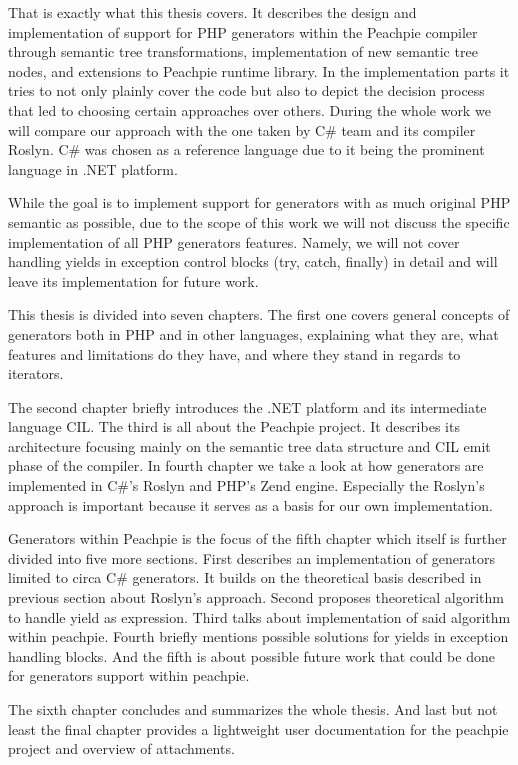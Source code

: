 That is exactly what this thesis covers. It describes the design and implementation of support for PHP generators within the Peachpie compiler through semantic tree transformations, implementation of new semantic tree nodes, and extensions to Peachpie runtime library. In the implementation parts it tries to not only plainly cover the code but also to depict the decision process that led to choosing certain approaches over others. During the whole work we will compare our approach with the one taken by C\# team and its compiler Roslyn. C\# was chosen as a reference language due to it being the prominent language in .NET platform.

While the goal is to implement support for generators with as much original PHP semantic as possible, due to the scope of this work we will not discuss the specific implementation of all PHP generators features. Namely, we will not cover handling yields in exception control blocks (try, catch, finally) in detail and will leave its implementation for future work.

This thesis is divided into seven chapters. The first one covers general concepts of generators both in PHP and in other languages, explaining what they are, what features and limitations do they have, and where they stand in regards to iterators. 

The second chapter briefly introduces the .NET platform and its intermediate language CIL. The third is all about the Peachpie project. It describes its architecture focusing mainly on the semantic tree data structure and CIL emit phase of the compiler. In fourth chapter we take a look at how generators are implemented in C\#’s Roslyn and PHP’s Zend engine. Especially the Roslyn’s approach is important because it serves as a basis for our own implementation.
 
Generators within Peachpie is the focus of the fifth chapter which itself is further divided into five more sections. First describes an implementation of generators limited to circa C\# generators. It builds on the theoretical basis described in previous section about Roslyn’s approach. Second proposes theoretical algorithm to handle yield as expression. Third talks about implementation of said algorithm within peachpie. Fourth briefly mentions possible solutions for yields in exception handling blocks. And the fifth is about possible future work that could be done for generators support within peachpie. 

The sixth chapter concludes and summarizes the whole thesis. And last but not least the final chapter provides a lightweight user documentation for the peachpie project and overview of attachments.

